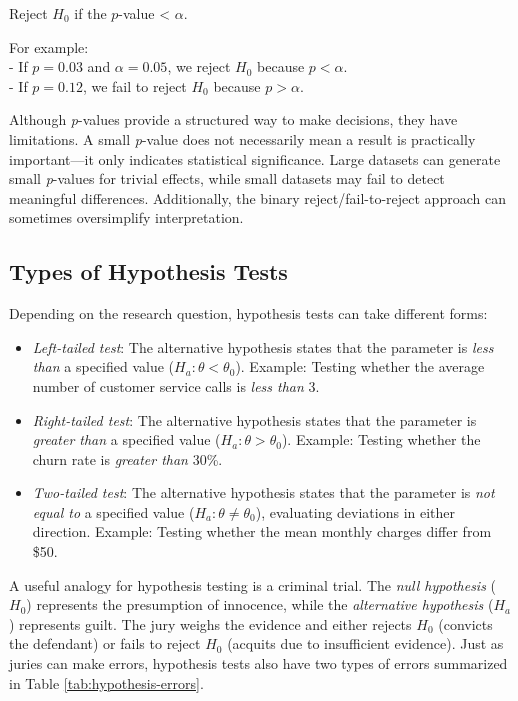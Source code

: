 \documentclass[
]{book}
\providecommand{\tightlist}{%
  \setlength{\itemsep}{0pt}\setlength{\parskip}{0pt}}
\theoremstyle{definition}
\theoremstyle{definition}
\theoremstyle{definition}
\theoremstyle{definition}
\theoremstyle{remark}
\begin{document}
Reject \(H_0\) if the \(p\)-value \textless{} \(\alpha\).

For example:\\
- If \(p = 0.03\) and \(\alpha = 0.05\), we reject \(H_0\) because \(p < \alpha\).\\
- If \(p = 0.12\), we fail to reject \(H_0\) because \(p > \alpha\).

Although \emph{p}-values provide a structured way to make decisions, they have limitations. A small \emph{p}-value does not necessarily mean a result is practically important---it only indicates statistical significance. Large datasets can generate small \emph{p}-values for trivial effects, while small datasets may fail to detect meaningful differences. Additionally, the binary reject/fail-to-reject approach can sometimes oversimplify interpretation.

\subsection{Types of Hypothesis Tests}\label{types-of-hypothesis-tests}

Depending on the research question, hypothesis tests can take different forms:

\begin{itemize}
\tightlist
\item
  \emph{Left-tailed test}: The alternative hypothesis states that the parameter is \emph{less than} a specified value (\(H_a: \theta < \theta_0\)). Example: Testing whether the average number of customer service calls is \emph{less than} 3.\\
\item
  \emph{Right-tailed test}: The alternative hypothesis states that the parameter is \emph{greater than} a specified value (\(H_a: \theta > \theta_0\)). Example: Testing whether the churn rate is \emph{greater than} 30\%.\\
\item
  \emph{Two-tailed test}: The alternative hypothesis states that the parameter is \emph{not equal to} a specified value (\(H_a: \theta \neq \theta_0\)), evaluating deviations in either direction. Example: Testing whether the mean monthly charges differ from \$50.
\end{itemize}

A useful analogy for hypothesis testing is a criminal trial. The \emph{null hypothesis} (\(H_0\)) represents the presumption of innocence, while the \emph{alternative hypothesis} (\(H_a\)) represents guilt. The jury weighs the evidence and either rejects \(H_0\) (convicts the defendant) or fails to reject \(H_0\) (acquits due to insufficient evidence). Just as juries can make errors, hypothesis tests also have two types of errors summarized in Table \ref{tab:hypothesis-errors}.
\end{document}
